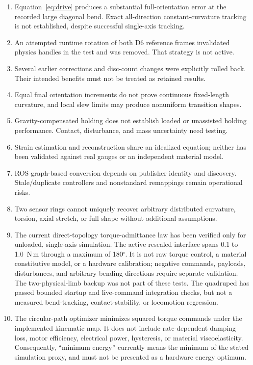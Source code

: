 \documentclass[11pt,letterpaper]{article}
\newcommand{\degrees}{\ensuremath{^{\circ}}}
\begin{document}
\begin{enumerate}
\item Equation~\eqref{eq:drive} produces a substantial full-orientation error
at the recorded large diagonal bend. Exact all-direction constant-curvature
tracking is not established, despite successful single-axis tracking.
\item An attempted runtime rotation of both D6 reference frames invalidated
physics handles in the test and was removed. That strategy is not active.
\item Several earlier corrections and disc-count changes were explicitly
rolled back. Their intended benefits must not be treated as retained results.
\item Equal final orientation increments do not prove continuous fixed-length
curvature, and local slew limits may produce nonuniform transition shapes.
\item Gravity-compensated holding does not establish loaded or unassisted
holding performance. Contact, disturbance, and mass uncertainty need testing.
\item Strain estimation and reconstruction share an idealized equation;
neither has been validated against real gauges or an independent material model.
\item ROS graph-based conversion depends on publisher identity and discovery.
Stale/duplicate controllers and nonstandard remappings remain operational risks.
\item Two sensor rings cannot uniquely recover arbitrary distributed curvature,
torsion, axial stretch, or full shape without additional assumptions.
\item The current direct-topology torque-admittance law has been verified only
for unloaded, single-axis simulation. The active rescaled interface spans 0.1
to 1.0~N\,m through a maximum of 180\degrees{}. It is not raw torque
control, a material constitutive model, or a hardware calibration; negative
commands, payloads, disturbances, and arbitrary bending directions require
separate validation. The two-physical-limb backup was not part of these tests.
The quadruped has passed bounded startup and live-command integration checks,
but not a measured bend-tracking, contact-stability, or locomotion regression.
\item The circular-path optimizer minimizes squared torque commands under the
implemented kinematic map. It does not include rate-dependent damping loss,
motor efficiency, electrical power, hysteresis, or material viscoelasticity.
Consequently, ``minimum energy'' currently means the minimum of the stated
simulation proxy, and must not be presented as a hardware energy optimum.
\end{enumerate}
\end{document}
